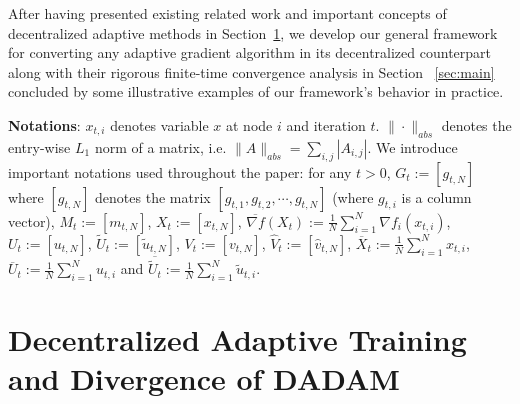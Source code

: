 \documentclass{article} %
\begin{document}
After having presented existing related work and important concepts of decentralized adaptive methods in Section~\ref{sec:prelim}, we develop our general framework for converting any adaptive gradient algorithm in its decentralized counterpart along with their rigorous finite-time convergence analysis in Section ~\ref{sec:main} concluded by some illustrative examples of our framework's behavior in practice. 

 \textbf{Notations}: $x_{t,i}$ denotes variable $x$ at node $i$ and iteration $t$. $\|\cdot \|_{abs}$ denotes the entry-wise $L_1$ norm of a matrix, i.e. $\|A\|_{abs}= \sum_{i,j} |A_{i,j}|$. 
We introduce important notations used throughout the paper: for any $t>0$, $G_t := [g_{t,N}]$ where $[g_{t,N}]$ denotes the matrix $[g_{t,1}, g_{t,2}, \cdots, g_{t,N}]$ (where $g_{t,i}$ is a column vector), $M_t := [m_{t,N}]$, $X_t := [x_{t,N}]$, $\overline {\nabla f}(X_t) := \frac{1}{N}\sum_{i=1}^N \nabla f_i(x_{t,i})$, $U_t := [u_{t,N}]$, $ \tilde U_t := [\tilde u_{t,N}]$, $ V_t := [ v_{t,N}]$, $\hat V_t := [\hat v_{t,N}]$, $\overline X_t := \frac{1}{N}\sum_{i=1}^N x_{t,i} $, $\overline U_t := \frac{1}{N}\sum_{i=1}^N u_{t,i} $ and $\overline {\tilde U_t} := \frac{1}{N}\sum_{i=1}^N  \tilde u_{t,i} $. 


 
\vspace{-0.05in}
\section{Decentralized Adaptive Training and Divergence of DADAM}\label{sec:prelim}
\vspace{-0.05in}
\end{document}
